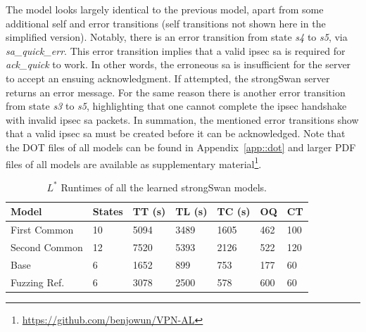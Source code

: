 The model looks largely identical to the previous model, apart from some additional self and error transitions (self transitions not shown here in the simplified version). Notably, there is an error transition from state \emph{s4} to \emph{s5}, via \emph{sa\_quick\_err}. This error transition implies that a valid \ac{ipsec} \ac{sa} is required for \emph{ack\_quick} to work. In other words, the erroneous \ac{sa} is insufficient for the server to accept an ensuing acknowledgment. If attempted, the strongSwan server returns an error message. For the same reason there is another error transition from state \emph{s3} to \emph{s5}, highlighting that one cannot complete the \ac{ipsec} handshake with invalid \ac{ipsec} \ac{sa} packets. In summation, the mentioned error transitions show that a valid \ac{ipsec} \ac{sa} must be created before it can be acknowledged. Note that the DOT files of all models can be found in Appendix~\ref{app::dot} and larger PDF files of all models are available as supplementary material\footnote{\url{https://github.com/benjowun/VPN-AL}}.
\vspace{3mm}
\begin{table}[H]
	\centering
	\begin{tabular}{|l|l|l|l|l|l|l|}
		\hline
		\rowcolor[HTML]{C0C0C0} 
		Model     & States & TT (s)   & TL (s)   & TC (s)   & OQ  & CT  \\ \hline
		First Common  & 10     & 5094 & 3489 & 1605 & 462 & 100 \\ \hline
		Second Common  & 12     & 7520 & 5393 & 2126 & 522 & 120 \\ \hline
		Base      & 6      & 1652 & 899  & 753  & 177 & 60  \\ \hline
		Fuzzing Ref. & 6      & 3078 & 2500 & 578  & 600 & 60  \\ \hline
	\end{tabular}
	\caption{$L^*$ Runtimes of all the learned strongSwan models.}
	\label{tab:runtime_summary_lstar}
\end{table}
\vspace{3mm}

